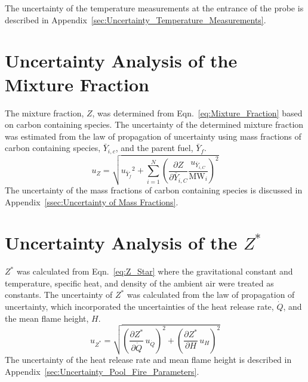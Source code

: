 \documentclass[12pt]{article}
\begin{document}
The uncertainty of the temperature measurements at the entrance of the probe is described in Appendix~\ref{sec:Uncertainty_Temperature_Measurements}.

\pagebreak

\section{Uncertainty Analysis of the Mixture Fraction}\label{sec:Uncertainty_Mix_Frac}
The mixture fraction, $Z$, was determined from Eqn.~\ref{eq:Mixture_Fraction} based on carbon containing species. The uncertainty of the determined mixture fraction was estimated from the law of propagation of uncertainty using mass fractions of carbon containing species, $\bar{Y}_{i,c}$, and the parent fuel, $\bar{Y}_{f}$.
\begin{equation}
\label{eq:mixture_frac_uncertainty}
u_{\scriptscriptstyle Z}=\sqrt{{u_{\scriptscriptstyle \bar{Y}_{f}}}^2+{\sum_{i=1}^{N}{\left(\frac{\partial Z}{\partial \bar{Y}_{i,C}}\frac{u_{\scriptscriptstyle \bar{Y}_{i,C}}}{\textrm{MW}_{i}} \right)}^2}}
\end{equation}
The uncertainty of the mass fractions of carbon containing species is discussed in Appendix~\ref{ssec:Uncertainty of Mass Fractions}. 

\pagebreak

\section{Uncertainty Analysis of the $Z^{*}$}\label{sec:Uncertainty_Z_star}
$Z^{*}$ was calculated from Eqn.~\ref{eq:Z_Star} where the gravitational constant and temperature, specific heat, and density of the ambient air were treated as constants. The uncertainty of $Z^{*}$ was calculated from the law of propagation of uncertainty, which incorporated the uncertainties of the heat release rate, $\dot{Q}$, and the mean flame height, $H$. 
\begin{equation}
\label{eq:heat_release_rate_uncertainty}
u_{\scriptscriptstyle Z^{*}} = \sqrt{{\left(\frac{\partial Z^{*}}{\partial \dot{Q}}\,u_{\scriptscriptstyle \dot{Q}} \right)}^2+{\left(\frac{\partial Z^{*}}{\partial H}\,u_{\scriptscriptstyle H} \right)}^2}
\end{equation}
The uncertainty of the heat release rate and mean flame height is described in Appendix~\ref{sec:Uncertainty_Pool_Fire_Parameters}. 
\end{document}
